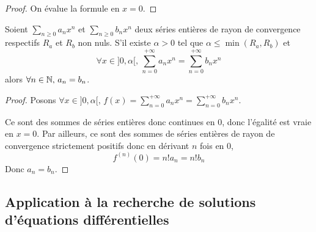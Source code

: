 \begin{proof}
    On évalue la formule en $x = 0$. 
\end{proof}

\begin{corollaire}{}{}
    Soient $\sum_{n \geqslant 0} a_n x^n$ et $\sum_{n \geqslant 0} b_n x^n$ deux séries entières
    de rayon de convergence respectifs $R_a$ et $R_b$ non nuls. S'il existe $\alpha > 0$ tel que 
    $\alpha \leqslant \min(R_a, R_b)$ et 
    $$\forall x \in ]0, \alpha[, \, \sum_{n = 0}^{+\infty} a_n x^n = \sum_{n = 0}^{+\infty} b_n x^n$$
    alors $\forall n \in \mathbb{N}, \, a_n = b_n$.
\end{corollaire}

\begin{proof}
    Posons $\displaystyle \forall x \in ]0, \alpha[, \, f(x) = \sum_{n = 0}^{+\infty} a_n x^n = \sum_{n = 0}^{+\infty} b_n x^n$. 

    Ce sont des sommes de séries entières donc continues en $0$, donc l'égalité est vraie en 
    $x = 0$. Par ailleurs, ce sont des sommes de séries entières de rayon de convergence 
    strictement positifs donc en dérivant $n$ fois en $0$, 
    $$f^{(n)}(0) = n ! a_n = n! b_n$$
    Donc $a_n = b_n$.
\end{proof}

\subsection{Application à la recherche de solutions d'équations différentielles}


